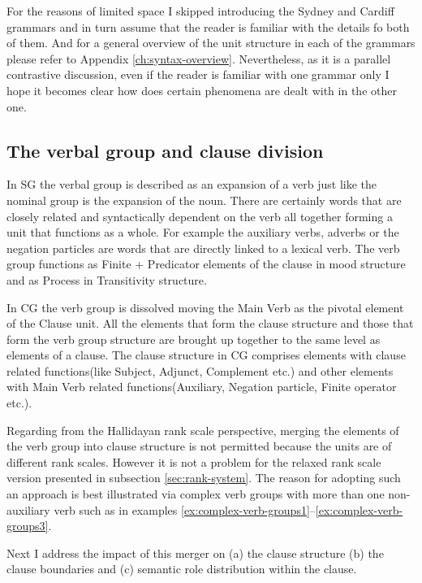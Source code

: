 For the reasons of limited space I skipped introducing the Sydney and Cardiff grammars and in turn assume that the reader is familiar with the details fo both of them. And for a general overview of the unit structure in each of the grammars please refer to Appendix \ref{ch:syntax-overview}. Nevertheless, as it is a parallel contrastive discussion, even if the reader is familiar with one grammar only I hope it becomes clear how does certain phenomena are dealt with in the other one. 

\subsection{The verbal group and clause division}
\label{sec:verbal-grpoup-and-clause-division}
In SG the verbal group is described as an expansion of a verb just like the nominal group is the expansion of the noun\citep[396]{Halliday2013}. There are certainly words that are closely related and syntactically dependent on the verb all together forming a unit that functions as a whole. For example the auxiliary verbs, adverbs or the negation particles are words that are directly linked to a lexical verb. The verb group functions as Finite + Predicator elements of the clause in mood structure and as Process in Transitivity structure. 

In CG the verb group is dissolved moving the Main Verb as the pivotal element of the Clause unit. All the elements that form the clause structure and those that form the verb group structure are brought up together to the same level as elements of a clause. The clause structure in CG comprises elements with clause related functions(like Subject, Adjunct, Complement etc.) and other elements with Main Verb related functions(Auxiliary, Negation particle, Finite operator etc.).

Regarding from the Hallidayan rank scale perspective, merging the elements of the verb group into clause structure is not permitted because the units are of different rank scales. However it is not a problem for the relaxed rank scale version presented in subsection \ref{sec:rank-system}. The reason for adopting such an approach is best illustrated via complex verb groups with more than one non-auxiliary verb such as in examples \ref{ex:complex-verb-groups1}--\ref{ex:complex-verb-groups3}. 

Next I address the impact of this merger on (a) the clause structure (b) the clause boundaries and (c) semantic role distribution within the clause.

